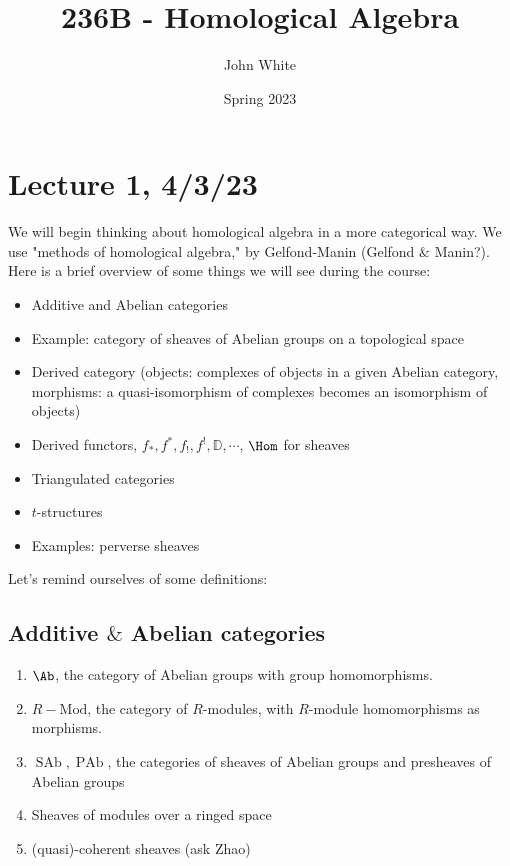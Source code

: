 \documentclass[x11names,reqno,14pt]{extarticle}
\title{236B - Homological Algebra}
\author{John White}
\date{Spring 2023}
\newcommand{\RMod}{R-\text{Mod}}
\newcommand{\D}{\mathbb{D}}
\DeclareMathOperator{\SAb}{SAb}
\DeclareMathOperator{\PAb}{PAb}
\begin{document}
\section*{Lecture 1, 4/3/23}

We will begin thinking about homological algebra in a more categorical way. We use "methods of homological algebra," by Gelfond-Manin (Gelfond $\&$ Manin?). Here is a brief overview of some things we will see during the course:

\begin{itemize}

\item Additive and Abelian categories

\item Example: category of sheaves of Abelian groups on a topological space

\item Derived category (objects: complexes of objects in a given Abelian category, morphisms: a quasi-isomorphism of complexes becomes an isomorphism of objects)

\item Derived functors, $f_*, f^*, f_{!}, f^{!}, \D, \cdots$, $\Hom$ for sheaves

\item Triangulated categories

\item $t$-structures

\item Examples: perverse sheaves


\end{itemize} 


Let's remind ourselves of some definitions:

\subsection*{Additive $\&$ Abelian categories}

\exm

\begin{enumerate}[label=(\alph*)]

\item $\Ab$, the category of Abelian groups with group homomorphisms.

\item $\RMod$, the category of $R$-modules, with $R$-module homomorphisms as morphisms.

\item $\SAb, \PAb$, the categories of sheaves of Abelian groups and presheaves of Abelian groups

\item Sheaves of modules over a ringed space 

\item (quasi)-coherent sheaves (ask Zhao)

\end{enumerate}
\end{document}
